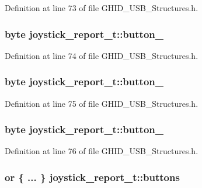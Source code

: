 \-Definition at line 73 of file \-G\-H\-I\-D\-\_\-\-U\-S\-B\-\_\-\-Structures.\-h.

\hypertarget{structjoystick__report__t_a962c2ec3124700193a5153f9efe862bd}{
\subsubsection[{button\-\_\-6}]{\setlength{\rightskip}{0pt plus 5cm}byte {\bf joystick\-\_\-report\-\_\-t\-::button\-\_}}}\label{structjoystick__report__t_a962c2ec3124700193a5153f9efe862bd}


\-Definition at line 74 of file \-G\-H\-I\-D\-\_\-\-U\-S\-B\-\_\-\-Structures.\-h.

\hypertarget{structjoystick__report__t_af93282ad1ac14cace7c2c1739b6d0998}{
\subsubsection[{button\-\_\-7}]{\setlength{\rightskip}{0pt plus 5cm}byte {\bf joystick\-\_\-report\-\_\-t\-::button\-\_}}}\label{structjoystick__report__t_af93282ad1ac14cace7c2c1739b6d0998}


\-Definition at line 75 of file \-G\-H\-I\-D\-\_\-\-U\-S\-B\-\_\-\-Structures.\-h.

\hypertarget{structjoystick__report__t_a26bd852e878a85aa8bfe428832cc8fe6}{
\subsubsection[{button\-\_\-8}]{\setlength{\rightskip}{0pt plus 5cm}byte {\bf joystick\-\_\-report\-\_\-t\-::button\-\_}}}\label{structjoystick__report__t_a26bd852e878a85aa8bfe428832cc8fe6}


\-Definition at line 76 of file \-G\-H\-I\-D\-\_\-\-U\-S\-B\-\_\-\-Structures.\-h.

\hypertarget{structjoystick__report__t_a653cada3bce72bb704999f5dc08faba2}{
\subsubsection[{buttons}]{\setlength{\rightskip}{0pt plus 5cm}or \{ ... \}  {\bf joystick\-\_\-report\-\_\-t\-::buttons}}}\label{structjoystick__report__t_a653cada3bce72bb704999f5dc08faba2}


